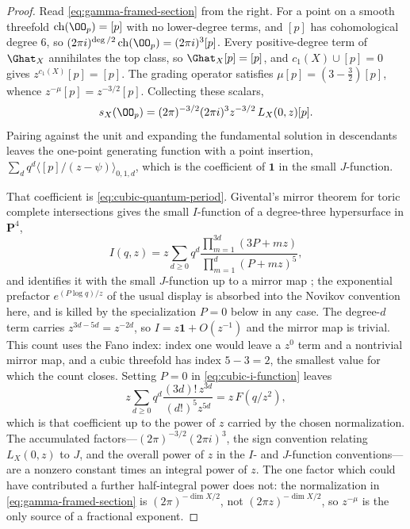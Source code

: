\begin{proof}
Read \eqref{eq:gamma-framed-section} from the right.  For a point on a smooth
threefold \(\operatorname{ch}(\OO_p)=[p]\) with no lower-degree terms, and
\([p]\) has cohomological degree \(6\), so
\((2\pi i)^{\deg/2}\operatorname{ch}(\OO_p)=(2\pi i)^3[p]\).  Every
positive-degree term of \(\Ghat_X\) annihilates the top class, so
\(\Ghat_X[p]=[p]\), and \(c_1(X)\cup[p]=0\) gives \(z^{c_1(X)}[p]=[p]\).  The
grading operator satisfies \(\mu[p]=(3-\tfrac32)[p]\), whence
\(z^{-\mu}[p]=z^{-3/2}[p]\).  Collecting these scalars,
\[
 s_X(\OO_p)=(2\pi)^{-3/2}(2\pi i)^3z^{-3/2}\,L_X(0,z)[p].
\]
Pairing against the unit and expanding the fundamental solution in
descendants leaves the one-point generating function with a point insertion,
\(\sum_dq^d\langle[p]/(z-\psi)\rangle_{0,1,d}\), which is the coefficient of
\(\mathbf 1\) in the small \(J\)-function.

That coefficient is \eqref{eq:cubic-quantum-period}.  Givental's mirror
theorem for toric complete intersections gives the small \(I\)-function of a
degree-three hypersurface in \(\mathbf P^4\),
\begin{equation}\label{eq:cubic-i-function}
 I(q,z)=z\sum_{d\geq0}q^d
 \frac{\prod_{m=1}^{3d}(3P+mz)}{\prod_{m=1}^{d}(P+mz)^5},
\end{equation}
and identifies it with the small \(J\)-function up to a mirror map
\cite{GiventalToricCI,CoatesGivental}; the exponential prefactor
\(e^{(P\log q)/z}\) of the usual display is absorbed into the Novikov
convention here, and is killed by the specialization \(P=0\) below in any
case.  The degree-\(d\) term carries \(z^{3d-5d}=z^{-2d}\), so
\(I=z\mathbf 1+O(z^{-1})\) and the mirror map is trivial.  This count uses
the Fano index: index one would leave a \(z^0\) term and a nontrivial mirror
map, and a cubic threefold has index \(5-3=2\), the smallest value for which
the count closes.  Setting \(P=0\) in \eqref{eq:cubic-i-function} leaves
\[
 z\sum_{d\geq0}q^d\frac{(3d)!\,z^{3d}}{(d!)^5z^{5d}}
 =z\,F(q/z^2),
\]
which is that coefficient up to the power of \(z\) carried by the chosen
normalization.  The accumulated factors---\((2\pi)^{-3/2}(2\pi i)^3\), the
sign convention relating \(L_X(0,z)\) to \(J\), and the overall power of
\(z\) in the \(I\)- and \(J\)-function conventions---are a nonzero constant
times an integral power of \(z\).  The one factor which could have contributed
a further half-integral power does not: the normalization in
\eqref{eq:gamma-framed-section} is \((2\pi)^{-\dim X/2}\), not
\((2\pi z)^{-\dim X/2}\), so \(z^{-\mu}\) is the only source of a fractional
exponent.
\end{proof}

